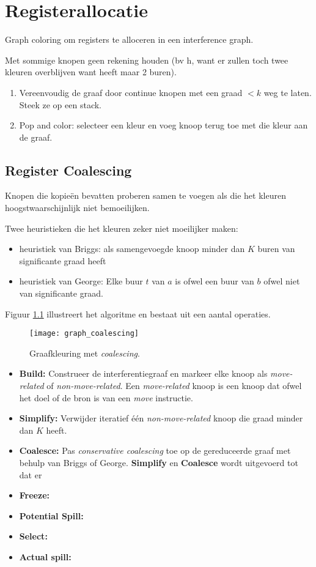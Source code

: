 \chapter{Registerallocatie}
Graph coloring om registers te alloceren in een interference graph.


Met sommige knopen geen rekening houden (bv h, want er zullen toch twee kleuren overblijven want heeft maar 2 buren).

\begin{enumerate}
	\item Vereenvoudig de graaf door continue knopen met een graad $< k$ weg te laten. Steek ze op een stack.
	\item Pop and color: selecteer een kleur en voeg knoop terug toe met die kleur aan de graaf.
\end{enumerate} 

\section{Register Coalescing}
Knopen die kopieën bevatten proberen samen te voegen als die het kleuren hoogstwaarschijnlijk niet bemoeilijken.

Twee heuristieken die het kleuren zeker niet moeilijker maken:
\begin{itemize}
	\item heuristiek van Briggs: als samengevoegde knoop minder dan $K$ buren van significante graad heeft
	\item heuristiek van George: Elke buur $t$ van $a$ is ofwel een buur van $b$ ofwel niet van significante graad.
\end{itemize}

Figuur \ref{fig:graph_coalescing} illustreert het algoritme en bestaat uit een aantal operaties.

\begin{figure}
	\texttt{[image: graph\_coalescing]}
	\caption{Graafkleuring met \textit{coalescing}.}
	\label{fig:graph_coalescing}
\end{figure}

\begin{itemize}
	\item \textbf{Build:} Construeer de interferentiegraaf en markeer elke knoop als \textit{move-related} of \textit{non-move-related}. Een \textit{move-related} knoop is een knoop dat ofwel het doel of de bron is van een \textit{move} instructie.
	\item \textbf{Simplify:} Verwijder iteratief één \textit{non-move-related} knoop die  graad minder dan $K$ heeft.
	\item \textbf{Coalesce:} Pas \textit{conservative coalescing} toe op de gereduceerde graaf met behulp van Briggs of George. \textbf{Simplify} en \textbf{Coalesce} wordt uitgevoerd tot dat er 
	\item \textbf{Freeze:}
	\item \textbf{Potential Spill:}
	\item \textbf{Select:}
	\item \textbf{Actual spill:}
\end{itemize}